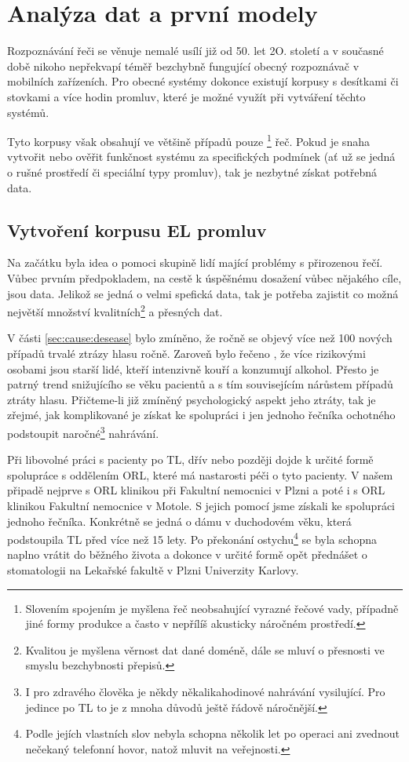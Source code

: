 \section{Analýza dat a první modely}
\label{chap:experiments:analysis}

Rozpoznávání řeči se věnuje nemalé usílí již od 50. let 2O. století a v současné době nikoho nepřekvapí téměř bezchybně fungující obecný rozpoznávač v mobilních zařízeních. Pro obecné systémy dokonce existují korpusy s desítkami či stovkami a více hodin promluv, které je možné využít při vytváření těchto systémů.

Tyto korpusy však obsahují ve většině případů pouze \footnote{Slovením spojením  je myšlena řeč neobsahující vyrazné řečové vady, případně jiné formy produkce a často v nepřílíš akusticky náročném prostředí.} řeč. Pokud je snaha vytvořit nebo ověřit funkčnost systému za specifických podmínek (ať už se jedná o rušné prostředí či speciální typy promluv), tak je nezbytné získat potřebná data.

\subsection{Vytvoření korpusu EL promluv}

Na začátku byla idea o pomoci skupině lidí mající problémy s přirozenou řečí. Vůbec prvním předpokladem, na cestě k úspěšnému dosažení vůbec nějakého cíle, jsou data. Jelikož se jedná o velmi spefická data, tak je potřeba zajistit co možná největší množství kvalitních\footnote{Kvalitou je myšlena věrnost dat dané doméně, dále se mluví o přesnosti ve smyslu bezchybnosti přepisů.} a přesných dat.

V části \ref{sec:cause:desease} bylo zmíněno, že ročně se objevý více než 100 nových případů trvalé ztrázy hlasu ročně. Zaroveň bylo řečeno \cite{Skvrnakova2010}, že více rizikovými osobami jsou starší lidé, kteří intenzivně kouří a konzumují alkohol. Přesto je patrný trend snižujícího se věku pacientů a s tím souvisejícím nárůstem případů ztráty hlasu. Přičteme-li již zmíněný psychologický aspekt jeho ztráty, tak je zřejmé, jak komplikované je získat ke spolupráci i jen jednoho řečníka ochotného podstoupit naročné\footnote{I pro zdravého člověka je někdy někalikahodinové nahrávání vysilující. Pro jedince po TL to je z mnoha důvodů ještě řádově náročnější.} nahrávání.

Při libovolné práci s pacienty po TL, dřív nebo později dojde k určité formě spolupráce s oddělením ORL, které má nastarosti péči o tyto pacienty. V našem připadě nejprve s ORL klinikou při Fakultní nemocnici v Plzni a poté i s ORL klinikou Fakultní nemocnice v Motole. S jejich pomocí jsme získali ke spolupráci jednoho řečníka. Konkrétně se jedná o dámu v duchodovém věku, která podstoupila TL před více než 15 lety. Po překonání ostychu\footnote{Podle jejích vlastních slov nebyla schopna několik let po operaci ani zvednout nečekaný telefonní hovor, natož mluvit na veřejnosti.} se byla schopna naplno vrátit do běžného života a dokonce v určité formě opět přednášet o stomatologii na Lekařské fakultě v Plzni Univerzity Karlovy.

